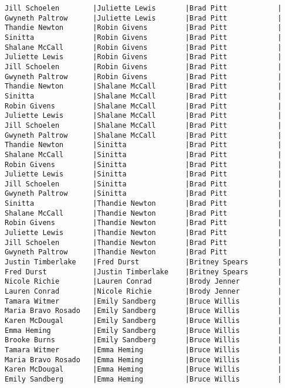 \documentclass{article}
\begin{document}
\begin{verbatim}
Jill Schoelen        |Juliette Lewis       |Brad Pitt            |
Gwyneth Paltrow      |Juliette Lewis       |Brad Pitt            |
Thandie Newton       |Robin Givens         |Brad Pitt            |
Sinitta              |Robin Givens         |Brad Pitt            |
Shalane McCall       |Robin Givens         |Brad Pitt            |
Juliette Lewis       |Robin Givens         |Brad Pitt            |
Jill Schoelen        |Robin Givens         |Brad Pitt            |
Gwyneth Paltrow      |Robin Givens         |Brad Pitt            |
Thandie Newton       |Shalane McCall       |Brad Pitt            |
Sinitta              |Shalane McCall       |Brad Pitt            |
Robin Givens         |Shalane McCall       |Brad Pitt            |
Juliette Lewis       |Shalane McCall       |Brad Pitt            |
Jill Schoelen        |Shalane McCall       |Brad Pitt            |
Gwyneth Paltrow      |Shalane McCall       |Brad Pitt            |
Thandie Newton       |Sinitta              |Brad Pitt            |
Shalane McCall       |Sinitta              |Brad Pitt            |
Robin Givens         |Sinitta              |Brad Pitt            |
Juliette Lewis       |Sinitta              |Brad Pitt            |
Jill Schoelen        |Sinitta              |Brad Pitt            |
Gwyneth Paltrow      |Sinitta              |Brad Pitt            |
Sinitta              |Thandie Newton       |Brad Pitt            |
Shalane McCall       |Thandie Newton       |Brad Pitt            |
Robin Givens         |Thandie Newton       |Brad Pitt            |
Juliette Lewis       |Thandie Newton       |Brad Pitt            |
Jill Schoelen        |Thandie Newton       |Brad Pitt            |
Gwyneth Paltrow      |Thandie Newton       |Brad Pitt            |
Justin Timberlake    |Fred Durst           |Britney Spears       |
Fred Durst           |Justin Timberlake    |Britney Spears       |
Nicole Richie        |Lauren Conrad        |Brody Jenner         |
Lauren Conrad        |Nicole Richie        |Brody Jenner         |
Tamara Witmer        |Emily Sandberg       |Bruce Willis         |
Maria Bravo Rosado   |Emily Sandberg       |Bruce Willis         |
Karen McDougal       |Emily Sandberg       |Bruce Willis         |
Emma Heming          |Emily Sandberg       |Bruce Willis         |
Brooke Burns         |Emily Sandberg       |Bruce Willis         |
Tamara Witmer        |Emma Heming          |Bruce Willis         |
Maria Bravo Rosado   |Emma Heming          |Bruce Willis         |
Karen McDougal       |Emma Heming          |Bruce Willis         |
Emily Sandberg       |Emma Heming          |Bruce Willis         |

\end{verbatim}
\end{document}

